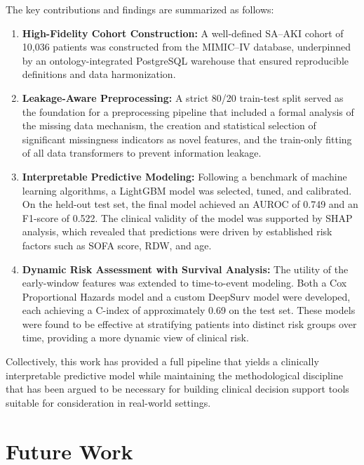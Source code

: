 The key contributions and findings are summarized as follows:
\begin{enumerate}
    \item \textbf{High-Fidelity Cohort Construction:} A well-defined SA--AKI cohort of 10,036 patients was constructed from the MIMIC--IV database, underpinned by an ontology-integrated PostgreSQL warehouse that ensured reproducible definitions and data harmonization.

    \item \textbf{Leakage-Aware Preprocessing:} A strict 80/20 train-test split served as the foundation for a preprocessing pipeline that included a formal analysis of the missing data mechanism, the creation and statistical selection of significant missingness indicators as novel features, and the train-only fitting of all data transformers to prevent information leakage.

    \item \textbf{Interpretable Predictive Modeling:} Following a benchmark of machine learning algorithms, a LightGBM model was selected, tuned, and calibrated. On the held-out test set, the final model achieved an AUROC of 0.749 and an F1-score of 0.522. The clinical validity of the model was supported by SHAP analysis, which revealed that predictions were driven by established risk factors such as SOFA score, RDW, and age.

    \item \textbf{Dynamic Risk Assessment with Survival Analysis:} The utility of the early-window features was extended to time-to-event modeling. Both a Cox Proportional Hazards model and a custom DeepSurv model were developed, each achieving a C-index of approximately 0.69 on the test set. These models were found to be effective at stratifying patients into distinct risk groups over time, providing a more dynamic view of clinical risk.
\end{enumerate}

Collectively, this work has provided a full pipeline that yields a clinically interpretable predictive model while maintaining the methodological discipline that has been argued to be necessary for building clinical decision support tools suitable for consideration in real-world settings.


\section{Future Work}

